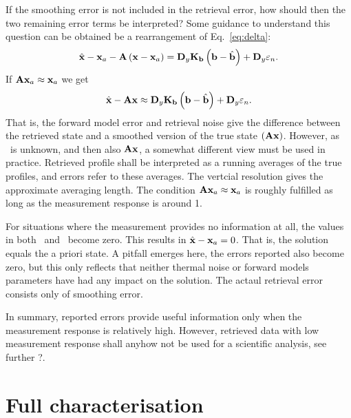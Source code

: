 If the smoothing error is not included in the retrieval error, how should then
the two remaining error terms be interpreted? Some guidance to understand this
question can be obtained be a rearrangement of Eq.~\ref{eq:delta}:
\begin{equation}
  \hat{\mathbf{x}} -\mathbf{x}_{a} - \mathbf{A}\left( \mathbf{x}-\mathbf{x}_{a} \right) = 
    \mathbf{D}_{y}\mathbf{K}_{\mathbf{b}}\left(\mathbf{b}-\hat{\mathbf{b}}\right) +
    \mathbf{D}_{y}\varepsilon_n.
\end{equation}
If $\mathbf{A}\mathbf{x}_{a}\approx\mathbf{x}_{a}$ we get
\begin{equation}
  \hat{\mathbf{x}} - \mathbf{A}\mathbf{x} \approx 
    \mathbf{D}_{y}\mathbf{K}_{\mathbf{b}}\left(\mathbf{b}-\hat{\mathbf{b}}\right) +
    \mathbf{D}_{y}\varepsilon_n.
\end{equation}
That is, the forward model error and retrieval noise give the difference
between the retrieved state and a smoothed version of the true state
$(\mathbf{A}\mathbf{x})$. However, as \SttVct\ is unknown, and then also
$\mathbf{A}\mathbf{x}$, a somewhat different view must be used in practice.
Retrieved profile shall be interpreted as a running averages of the true
profiles, and errors refer to these averages. The vertcial resolution
gives the approximate averaging length. The condition
$\mathbf{A}\mathbf{x}_{a}\approx\mathbf{x}_{a}$ is roughly fulfilled as long as the
measurement response is around 1.

For situations where the measurement provides no information at all, the values
in both \CtrFncMtr\ and \AvrKrnMtr\ become zero. This results in $\hat{\mathbf{x}} -
\mathbf{x}_{a} = 0$. That is, the solution equals the a priori state. A pitfall
emerges here, the errors reported also become zero, but this only reflects that
neither thermal noise or forward models parameters have had any impact on the
solution. The actaul retrieval error consists only of smoothing error.

In summary, reported errors provide useful information only when the
measurement response is relatively high. However, retrieved data with low
measurement response shall anyhow not be used for a scientific analysis, see further
?.


\section{Full characterisation}
%


